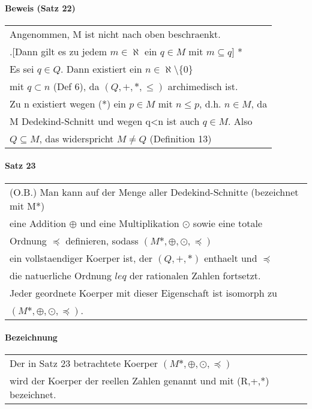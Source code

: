 \documentclass[a4paper]{scrartcl}
\begin{document}
\paragraph{Beweis (Satz 22)}
\begin{tabbing}
\begin{tabular}{l}
Angenommen, M ist nicht nach oben beschraenkt.\\
.[Dann gilt es zu jedem $m\in \aleph$ ein $q\in M$ mit $m \subseteq q$] *\\
Es sei $q\in Q$. Dann existiert ein $n\in \aleph\setminus\{ 0\}$\\
mit $q\subset n $ (Def 6), da $(Q,+,*,\leq)$ archimedisch ist.\\
Zu n existiert wegen (*) ein $p\in M$ mit $n \leq p$, d.h. $n \in M$, da\\
M Dedekind-Schnitt und wegen q<n ist auch $q\in M$. Also \\
$Q \subseteq M$, das widerspricht $M \neq Q$ (Definition 13)
\end{tabular}
\end{tabbing}

\paragraph{Satz 23}
\begin{tabbing}
\begin{tabular}{l}
(O.B.) Man kann auf der Menge aller Dedekind-Schnitte (bezeichnet mit M*)\\
eine Addition $\oplus$ und eine Multiplikation $\odot$ sowie eine totale\\
Ordnung $\preceq$ definieren, sodass $(M*,\oplus,\odot,\preceq)$\\
ein vollstaendiger Koerper ist, der $(Q,+,*)$ enthaelt und $\preceq$\\
die natuerliche Ordnung $leq$ der rationalen Zahlen fortsetzt.\\
Jeder geordnete Koerper mit dieser Eigenschaft ist isomorph zu\\
$(M*,\oplus,\odot,\preceq)$.
\end{tabular}
\end{tabbing}

\paragraph{Bezeichnung}
\begin{tabbing}
\begin{tabular}{l}
Der in Satz 23 betrachtete Koerper $(M*,\oplus,\odot,\preceq)$\\
wird der Koerper der reellen Zahlen genannt und mit (R,+,*) bezeichnet.
\end{tabular}
\end{tabbing}
\end{document}
